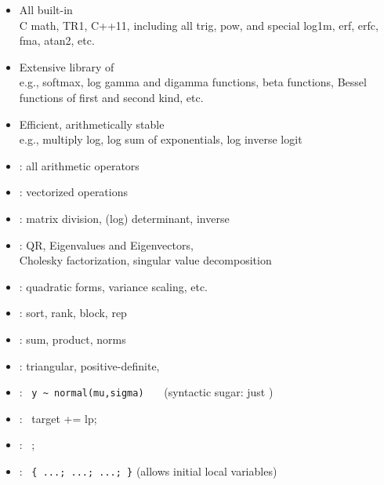 \documentclass[10pt]{report}
\begin{document}
%
\begin{itemize}
\item All built-in 
  \\
  {\footnotesize C math, TR1, C++11, including all trig, pow, and
    special log1m, erf, erfc, fma, atan2, etc.}
\item Extensive library of 
  \\
  {\footnotesize e.g., softmax,
    log gamma and digamma functions, beta functions, Bessel functions of
    first and second kind, etc.}
\item Efficient, arithmetically stable 
  \\
  {\footnotesize e.g., multiply log, log sum of
    exponentials, log inverse logit}
\end{itemize}


%
\begin{itemize}\small
\item {}: all arithmetic operators
\item {}: vectorized operations
\item {}: matrix division, (log) determinant,
  inverse
\item {}: QR, Eigenvalues and Eigenvectors,
  \\
  Cholesky factorization, singular value decomposition
\item {}: quadratic forms, variance scaling, etc.
\item {}: sort, rank, block, rep
\item {}: sum, product, norms
\item {}: triangular, positive-definite,
\end{itemize}


%
\begin{itemize}
\item {}: \ {\footnotesize \Verb|y ~ normal(mu,sigma)|}
  \ \ \ {\footnotesize (syntactic sugar: just )}
\item {}: \ {\footnotesize target += lp;}
\item {}: \  {\footnotesize {};}
\end{itemize}
\vspace*{12pt}
%
\begin{itemize}
\item {}: \ {\footnotesize \Verb|{ ...; ...; ...; }|}
  \hfill {\footnotesize
    (allows initial local variables)}
\end{itemize}
\end{document}
